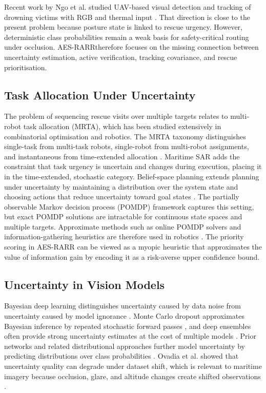 \documentclass[runningheads]{llncs}
\newcommand{\aes}{AES-RARR}
\begin{document}
Recent work by Ngo et al. studied UAV-based visual detection and tracking of drowning victims with RGB and thermal input \cite{ngo2026drowning}. That direction is close to the present problem because posture state is linked to rescue urgency. However, deterministic class probabilities remain a weak basis for safety-critical routing under occlusion. \aes therefore focuses on the missing connection between uncertainty estimation, active verification, tracking covariance, and rescue prioritisation.

\subsection{Task Allocation Under Uncertainty}

The problem of sequencing rescue visits over multiple targets relates to multi-robot task allocation (MRTA), which has been studied extensively in combinatorial optimisation and robotics. The MRTA taxonomy distinguishes single-task from multi-task robots, single-robot from multi-robot assignments, and instantaneous from time-extended allocation \cite{korsah2013mrta}. Maritime SAR adds the constraint that task urgency is uncertain and changes during execution, placing it in the time-extended, stochastic category. Belief-space planning extends planning under uncertainty by maintaining a distribution over the system state and choosing actions that reduce uncertainty toward goal states \cite{kaelbling1998pomdp}. The partially observable Markov decision process (POMDP) framework captures this setting, but exact POMDP solutions are intractable for continuous state spaces and multiple targets. Approximate methods such as online POMDP solvers and information-gathering heuristics are therefore used in robotics \cite{thrun2005probabilistic,lavalle2006planning}. The priority scoring in \aes{} can be viewed as a myopic heuristic that approximates the value of information gain by encoding it as a risk-averse upper confidence bound.

\subsection{Uncertainty in Vision Models}

Bayesian deep learning distinguishes uncertainty caused by data noise from uncertainty caused by model ignorance \cite{kendall2017uncertainties}. Monte Carlo dropout approximates Bayesian inference by repeated stochastic forward passes \cite{gal2016dropout}, and deep ensembles often provide strong uncertainty estimates at the cost of multiple models \cite{lakshminarayanan2017ensembles}. Prior networks and related distributional approaches further model uncertainty by predicting distributions over class probabilities \cite{malinin2018prior}. Ovadia et al. showed that uncertainty quality can degrade under dataset shift, which is relevant to maritime imagery because occlusion, glare, and altitude changes create shifted observations \cite{ovadia2019shift}.
\end{document}
